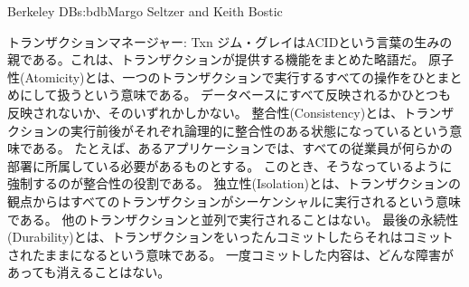 \begin{aosachapter}{Berkeley DB}{s:bdb}{Margo Seltzer and Keith Bostic}
\begin{aosasect1}{トランザクションマネージャー: Txn}
ジム・グレイはACIDという言葉の生みの親である。これは、トランザクションが提供する機能をまとめた略語だ\cite{bib:gray:trans}。
原子性(Atomicity)とは、一つのトランザクションで実行するすべての操作をひとまとめにして扱うという意味である。
データベースにすべて反映されるかひとつも反映されないか、そのいずれかしかない。
整合性(Consistency)とは、トランザクションの実行前後がそれぞれ論理的に整合性のある状態になっているという意味である。
たとえば、あるアプリケーションでは、すべての従業員が何らかの部署に所属している必要があるものとする。
このとき、そうなっているように強制するのが整合性の役割である。
独立性(Isolation)とは、トランザクションの観点からはすべてのトランザクションがシーケンシャルに実行されるという意味である。
他のトランザクションと並列で実行されることはない。
最後の永続性(Durability)とは、トランザクションをいったんコミットしたらそれはコミットされたままになるという意味である。
一度コミットした内容は、どんな障害があっても消えることはない。


\end{aosasect1}
\end{aosachapter}
